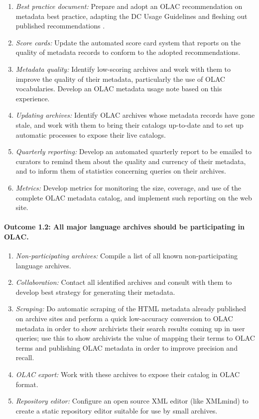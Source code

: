 \begin{enumerate}[label=\emph{\task\alph*}]\setlength{\itemsep}{0pt}
\item \emph{Best practice document:}
  Prepare and adopt an OLAC recommendation on metadata best practice,
  adapting the DC Usage Guidelines and fleshing out published recommendations
  \citep{BirdSimons03language,Simons06}.
\item \emph{Score cards:}
  Update the automated score card system that reports on the quality
  of metadata records to conform to the adopted recommendations.
\item \emph{Metadata quality:}
  Identify low-scoring archives and work with them to
  improve the quality of their metadata, particularly the
  use of OLAC vocabularies. 
  Develop an OLAC metadata usage note based on this experience.
\item \emph{Updating archives:}
  Identify OLAC archives whose metadata records have gone stale,
  and work with them to bring their catalogs up-to-date and to
  set up automatic processes to expose their live catalogs.
\item \emph{Quarterly reporting:}
  Develop an automated quarterly report to be emailed to curators to 
  remind them about the quality and currency of their metadata, and to
  inform them of statistics concerning queries on their archives.
\item \emph{Metrics:}
  Develop metrics for monitoring the size, coverage, and use of the 
  complete OLAC metadata catalog, and implement such reporting on the web site.

\end{enumerate}

\def\task{1.2}
\paragraph{Outcome {\task}: All major language archives should be participating in OLAC.}

\begin{enumerate}[label=\emph{\task\alph*}]\setlength{\itemsep}{0pt}
\item \emph{Non-participating archives:}
  Compile a list of all known non-participating language archives.
\item \emph{Collaboration:}
  Contact all identified archives and consult with them to develop best
  strategy for generating their metadata.
\item \emph{Scraping:}
  Do automatic scraping of the HTML metadata already published on
  archive sites and perform a quick low-accuracy conversion to OLAC
  metadata in order to show archivists their search results coming up
  in user queries; use this to show archivists the value of mapping their
  terms to OLAC terms and publishing OLAC metadata in order to
  improve precision and recall.
\item \emph{OLAC export:}
  Work with these archives to expose their catalog in OLAC format.
\item \emph{Repository editor:}
  Configure an open source XML editor (like XMLmind) to create a static repository editor
  suitable for use by small archives.
\end{enumerate}

